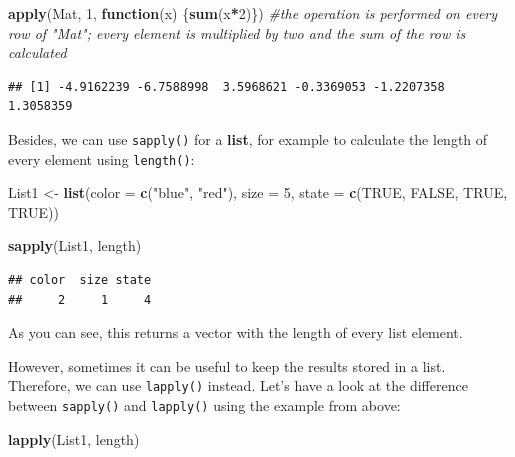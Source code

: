 \documentclass[
]{book}
\newenvironment{Shaded}{\begin{snugshade}}{\end{snugshade}}
\newcommand{\AttributeTok}[1]{\textcolor[rgb]{0.13,0.29,0.53}{#1}}
\newcommand{\CommentTok}[1]{\textcolor[rgb]{0.56,0.35,0.01}{\textit{#1}}}
\newcommand{\ConstantTok}[1]{\textcolor[rgb]{0.56,0.35,0.01}{#1}}
\newcommand{\ControlFlowTok}[1]{\textcolor[rgb]{0.13,0.29,0.53}{\textbf{#1}}}
\newcommand{\DecValTok}[1]{\textcolor[rgb]{0.00,0.00,0.81}{#1}}
\newcommand{\FunctionTok}[1]{\textcolor[rgb]{0.13,0.29,0.53}{\textbf{#1}}}
\newcommand{\NormalTok}[1]{#1}
\newcommand{\OtherTok}[1]{\textcolor[rgb]{0.56,0.35,0.01}{#1}}
\newcommand{\SpecialCharTok}[1]{\textcolor[rgb]{0.81,0.36,0.00}{\textbf{#1}}}
\newcommand{\StringTok}[1]{\textcolor[rgb]{0.31,0.60,0.02}{#1}}
\begin{document}
\begin{Shaded}
\begin{Highlighting}[]
\FunctionTok{apply}\NormalTok{(Mat, }\DecValTok{1}\NormalTok{, }\ControlFlowTok{function}\NormalTok{(x) \{}\FunctionTok{sum}\NormalTok{(x}\SpecialCharTok{*}\DecValTok{2}\NormalTok{)\}) }\CommentTok{\#the operation is performed on every row of "Mat"; every element is multiplied by two and the sum of the row is calculated}
\end{Highlighting}
\end{Shaded}

\begin{verbatim}
## [1] -4.9162239 -6.7588998  3.5968621 -0.3369053 -1.2207358  1.3058359
\end{verbatim}

Besides, we can use \texttt{sapply()} for a \textbf{list}, for example to calculate the length of every element using \texttt{length()}:

\begin{Shaded}
\begin{Highlighting}[]
\NormalTok{List1 }\OtherTok{\textless{}{-}} \FunctionTok{list}\NormalTok{(}\AttributeTok{color =} \FunctionTok{c}\NormalTok{(}\StringTok{"blue"}\NormalTok{, }\StringTok{"red"}\NormalTok{), }\AttributeTok{size =} \DecValTok{5}\NormalTok{, }\AttributeTok{state =} \FunctionTok{c}\NormalTok{(}\ConstantTok{TRUE}\NormalTok{, }\ConstantTok{FALSE}\NormalTok{, }\ConstantTok{TRUE}\NormalTok{, }\ConstantTok{TRUE}\NormalTok{))}

\FunctionTok{sapply}\NormalTok{(List1, length)}
\end{Highlighting}
\end{Shaded}

\begin{verbatim}
## color  size state 
##     2     1     4
\end{verbatim}

As you can see, this returns a vector with the length of every list element.

However, sometimes it can be useful to keep the results stored in a list.
Therefore, we can use \texttt{lapply()} instead.
Let's have a look at the difference between \texttt{sapply()} and \texttt{lapply()} using the example from above:

\begin{Shaded}
\begin{Highlighting}[]
\FunctionTok{lapply}\NormalTok{(List1, length)}
\end{Highlighting}
\end{Shaded}
\end{document}
